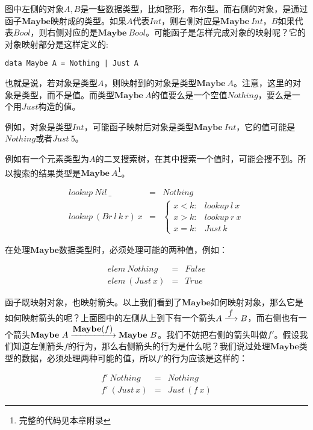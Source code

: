 \documentclass{article}
\begin{document}
\begin{example}
图中左侧的对象$A, B$是一些数据类型，比如整形，布尔型。而右侧的对象，是通过函子$\mathbf{Maybe}$映射成的类型。如果$A$代表$Int$，则右侧对应是$\mathbf{Maybe}\ Int$，$B$如果代表$Bool$，则右侧对应的是$\mathbf{Maybe}\ Bool$。可能函子是怎样完成对象的映射呢？它的对象映射部分是这样定义的:

\lstset{frame=none}
\begin{lstlisting}
data Maybe A = Nothing | Just A
\end{lstlisting}

也就是说，若对象是类型$A$，则映射到的对象是类型$\mathbf{Maybe}\ A$。注意，这里的对象是类型，而不是值。而类型$\mathbf{Maybe}\ A$的值要么是一个空值$Nothing$，要么是一个用$Just$构造的值。

例如，对象是类型$Int$，可能函子映射后对象是类型$\mathbf{Maybe}\ Int$，它的值可能是$Nothing$或者$Just\ 5$。

例如有一个元素类型为$A$的二叉搜索树，在其中搜索一个值时，可能会搜不到。所以搜索的结果类型是$\mathbf{Maybe}\ A$\footnote{完整的代码见本章附录}。

\[
\begin{array}{rcl}
lookup\ Nil\ \_ & = & Nothing \\
lookup\ (Br\ l\ k\ r)\ x & = & \begin{cases}
  x < k: & lookup\ l\ x \\
  x > k: & lookup\ r\ x \\
  x = k: & Just\ k
\end{cases}
\end{array}
\]

在处理$\mathbf{Maybe}$数据类型时，必须处理可能的两种值，例如：

\[
\begin{array}{lcl}
elem\ Nothing & = & False \\
elem\ (Just\ x) & = & True
\end{array}
\]

函子既映射对象，也映射箭头。以上我们看到了$\mathbf{Maybe}$如何映射对象，那么它是如何映射箭头的呢？上面图中的左侧从上到下有一个箭头$A \arrowto{f} B$，而右侧也有一个箭头$\mathbf{Maybe}\ A \arrowto{\mathbf{Maybe}(f)} \mathbf{Maybe}\ B$。我们不妨把右侧的箭头叫做$f'$。假设我们知道左侧箭头$f$的行为，那么右侧箭头的行为是什么呢？我们说过处理$\mathbf{Maybe}$类型的数据，必须处理两种可能的值，所以$f'$的行为应该是这样的：

\[
\begin{array}{lcl}
f'\ Nothing & = & Nothing \\
f'\ (Just\ x) & = & Just\ (f\ x)
\end{array}
\]


\end{example}
\end{document}
